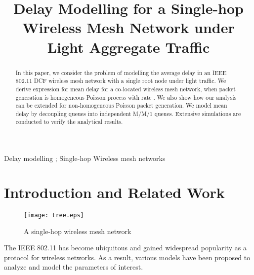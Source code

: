 \documentclass[10pt, conference, compsocconf]{IEEEtran}
\begin{document}
\title{Delay Modelling for a Single-hop Wireless Mesh Network under Light Aggregate Traffic}


\author{
}



\maketitle


\begin{abstract}
In this paper, we consider the problem of modelling the average delay in an IEEE 802.11 DCF wireless mesh network with a single root node under light traffic. We derive expression for mean delay for a co-located wireless mesh network, when packet generation is homogeneous Poisson process with rate . We also show how our analysis can be extended for non-homogeneous Poisson packet generation. We model mean delay by decoupling queues into independent M/M/1 queues. Extensive simulations are conducted to verify the analytical results.	
\end{abstract}

\begin{IEEEkeywords}
Delay modelling ; Single-hop Wireless mesh networks
\end{IEEEkeywords}

\IEEEpeerreviewmaketitle

\section{\large{Introduction and Related Work}}
\label{intro}

\begin{figure}[h]
\centering
\texttt{[image: tree.eps]}
\caption {A single-hop  wireless mesh network}
\label{fig:tree}
\end{figure}

The IEEE 802.11 has become ubiquitous and gained widespread popularity as a protocol for wireless networks. As a result, various models have been proposed to analyze and model the parameters of interest.
\end{document}
